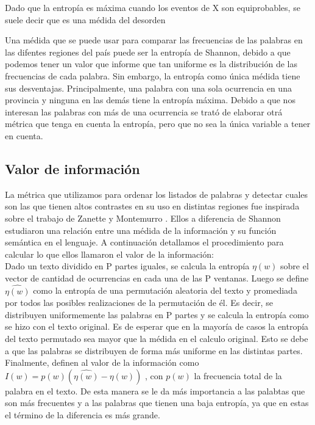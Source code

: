 Dado que la entropía es máxima cuando los eventos de X son equiprobables, se suele decir que es una médida del desorden

Una médida que se puede usar para comparar las frecuencias de las palabras en las difentes regiones del país puede ser la entropía de Shannon, debido a que podemos tener un valor que informe que tan uniforme es la distribución de las frecuencias de cada palabra.
Sin embargo, la entropía como única médida tiene sus desventajas. Principalmente, una palabra con una sola ocurrencia en una provincia y ninguna en las demás tiene la entropía máxima. Debido a que nos interesan las palabras con más de una ocurrencia se trató de elaborar otrá métrica que tenga en cuenta la entropía, pero que no sea la única variable a tener en cuenta.


\subsection{Valor de información}
La métrica que utilizamos para ordenar los listados de palabras y detectar cuales son
las que tienen altos contrastes en su uso en distintas regiones fue inspirada sobre el
trabajo de Zanette y Montemurro \cite{montemurro2010towards}.
Ellos a diferencia de Shannon estudiaron una relación entre una médida de la información y su función semántica en el lenguaje.
A continuación detallamos el procedimiento para calcular lo que ellos llamaron
el valor de la información: \\

Dado un texto dividido en P partes iguales, se calcula la entropía  $\eta(w)$ sobre el vector de cantidad de ocurrencias en cada una de las P ventanas.
Luego se define $\widehat{\eta(w)}$  como la entropía de una permutación aleatoria del texto y promediada por todos las posibles realizaciones de la permutación de él. 
Es decir, se distribuyen uniformemente las palabras en P partes y se calcula la
entropía como se hizo con el texto original. Es de esperar que en la mayoría de casos 
la entropía del texto permutado sea mayor que la médida en el calculo original. Esto 
se debe a que las palabras se distribuyen de forma más uniforme 
en las distintas partes.
Finalmente, definen al valor de la información como $I(w) = p(w) (\widehat{\eta(w)} - \eta(w))$ , con $p(w)$ la frecuencia total de la palabra en el texto. 
De esta manera se le da más importancia a las palabtas que son más frecuentes y a las palabras que tienen una baja entropía, ya que en estas el término de la diferencia es más grande.\\

